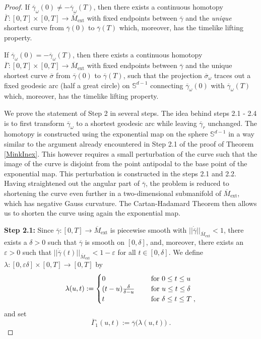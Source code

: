 \documentclass[reqno]{article}
\newcommand{\Sd}{\mathbb{S}^{d-1}}
\newcommand{\ovg}{\overline{\gamma}}
\newcommand{\oMe}{\overline{M}_\mathrm{ext}}
\begin{document}
\begin{proof}
If $\ovg_\omega (0) \neq - \ovg_\omega(T)$, then there exists a continuous homotopy $\overline{\Gamma} : [0, T] \times [0, T] \to \overline{M}_{\mathrm{ext}}$ with fixed endpoints between $\ovg$ and  the \emph{unique} shortest curve from $\ovg(0)$ to $\ovg(T)$ which, moreover, has the timelike lifting property.
 
If $\ovg_\omega(0) = -\ovg_\omega(T)$, then there exists a continuous homotopy $\overline{\Gamma} : [0, T] \times [0, T] \to \overline{M}_{\mathrm{ext}}$ with fixed endpoints between $\ovg$ and the unique shortest curve $\overline{\sigma}$ from $\ovg(0)$ to $\ovg(T)$, such that the projection $\overline{\sigma}_\omega$ traces out a fixed geodesic arc (half a great circle) on $\mathbb{S}^{d-1}$ connecting $\ovg_\omega(0)$ with $\ovg_\omega(T)$ which, moreover, has the timelike lifting property.
\vspace*{2mm}

We prove the statement of Step 2 in several steps. The idea behind steps 2.1 - 2.4 is to first transform $\ovg_\omega$ to a shortest geodesic arc while leaving $\ovg_r$ unchanged. The homotopy is constructed using the exponential map on the sphere $\Sd$ in a way similar to the argument already encountered in Step 2.1 of the proof of Theorem \ref{MinkInex}. This however requires a small perturbation of the curve such that the image of the curve is disjoint from the point antipodal to the base point of the exponential map. This perturbation is constructed in the steps 2.1 and 2.2. Having straightened out the angular part of $\ovg$, the problem is reduced to shortening the curve even further in a two-dimensional submanifold of $\oMe$, which has negative Gauss curvature. The Cartan-Hadamard Theorem then allows us to shorten the curve using again the exponential map.
\vspace*{2mm}

\textbf{Step 2.1:} Since $\ovg : [0,T] \to \oMe$ is piecewise smooth with $||\dot{\ovg}||_{\oMe} < 1$, there exists a $\delta >0$ such that $\ovg$ is smooth on $[0,\delta]$, and, moreover, there exists an $\varepsilon >0$ such that $||\dot{\ovg}(t)||_{\oMe} < 1 - \varepsilon$ for all  $t \in [0,\delta]$. We define $\lambda : [0, \varepsilon\delta] \times [0, T] \to [0,T]$ by
\begin{equation*}
\lambda(u,t) := \begin{cases} 0 &\textnormal{ for } 0 \leq t \leq u \\
(t-u) \frac{\delta}{\delta - u} \quad &\textnormal{ for } u \leq t \leq \delta \\
t &\textnormal{ for }  \delta \leq t \leq T \;,  \end{cases}
\end{equation*}
and set
\begin{equation*}
\overline{\Gamma}_1 (u,t) := \ovg\big( \lambda(u,t)\big) \;.
\end{equation*}



\end{proof}
\end{document}
